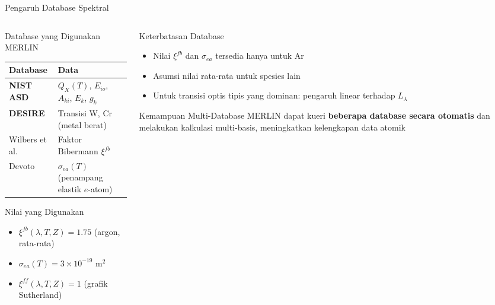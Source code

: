 \documentclass[aspectratio=169, 10pt]{beamer}
\begin{document}
\begin{frame}{Pengaruh Database Spektral}
  \begin{columns}[T]
    \begin{column}{0.55\textwidth}
      \begin{block}{Database yang Digunakan MERLIN}
        \small
        \begin{tabular}{ll}
          \toprule
          Database & Data \\
          \midrule
          \textbf{NIST ASD} & $Q_X(T)$, $E_{io}$, $A_{ki}$, $E_k$, $g_k$ \\
          \textbf{DESIRE} & Transisi W, Cr (metal berat) \\
          Wilbers et al. & Faktor Bibermann $\xi^{fb}$ \\
          Devoto & $\sigma_{ea}(T)$ (penampang elastik $e$-atom) \\
          \bottomrule
        \end{tabular}
      \end{block}
      \vspace{4pt}
      \begin{block}{Nilai yang Digunakan}
        \small
        \begin{itemize}
          \item $\xi^{fb}(\lambda,T,Z) = 1.75$ (argon, rata-rata)
          \item $\sigma_{ea}(T) = 3\times10^{-19}$ m$^2$
          \item $\xi^{ff}(\lambda,T,Z) = 1$ (grafik Sutherland)
        \end{itemize}
      \end{block}
    \end{column}
    \begin{column}{0.42\textwidth}
      \begin{alertblock}{Keterbatasan Database}
        \begin{itemize}\small
          \item Nilai $\xi^{fb}$ dan $\sigma_{ea}$ tersedia hanya untuk Ar
          \item Asumsi nilai rata-rata untuk spesies lain
          \item Untuk transisi optis tipis yang dominan: pengaruh linear terhadap $L_\lambda$
        \end{itemize}
      \end{alertblock}
      \vspace{6pt}
      \begin{exampleblock}{Kemampuan Multi-Database}
        \small
        MERLIN dapat kueri \textbf{beberapa database secara otomatis} dan melakukan kalkulasi multi-basis, meningkatkan kelengkapan data atomik
      \end{exampleblock}
    \end{column}
  \end{columns}
\end{frame}
\end{document}
